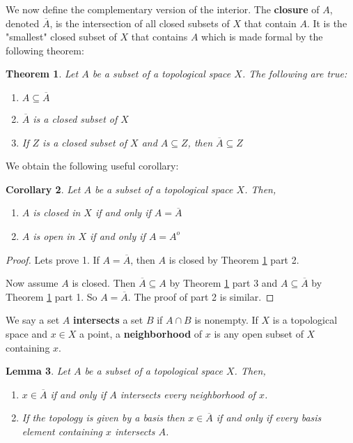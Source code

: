 \documentclass[a4paper]{article}
\newtheorem{theorem}{Theorem}
\newtheorem{lemma}[theorem]{Lemma}
\newtheorem{corollary}[theorem]{Corollary}
\numberwithin{theorem}{section}
\begin{document}
We now define the complementary version of the interior. The \textbf{closure} of $A$, denoted $\overline{A}$, is the intersection of all closed subsets of $X$ that contain $A$. It is the "smallest" closed subset of $X$ that contains $A$ which is made formal by the following theorem:

\begin{theorem} \label{closure}
Let $A$ be a subset of a topological space $X$. The following are true:
\begin{enumerate}
    \item $A \subseteq \overline{A}$
    \item $\overline{A}$ is a closed subset of $X$
    \item If $Z$ is a closed subset of $X$ and $A \subseteq Z$, then $\overline{A} \subseteq Z$
\end{enumerate}
\end{theorem}


We obtain the following useful corollary:
\begin{corollary}
Let $A$ be a subset of a topological space $X$. Then,
\begin{enumerate}
    \item $A$ is closed in $X$ if and only if $A = \overline{A}$
    \item $A$ is open in $X$ if and only if $A = A^o$
\end{enumerate}
\end{corollary}
\begin{proof}
Lets prove 1. If $A = \overline{A}$, then $A$ is closed by Theorem \ref{closure} part 2. 

Now assume $A$ is closed. Then $\overline{A} \subseteq A$ by Theorem \ref{closure} part 3 and $A \subseteq \overline{A}$ by Theorem \ref{closure} part 1. So $A = \overline{A}$. The proof of part 2 is similar.

\end{proof}

We say a set $A$ \textbf{intersects} a set $B$ if $A \cap B$ is nonempty. If $X$ is a topological space and $x \in X$ a point, a \textbf{neighborhood} of $x$ is any open subset of $X$ containing $x$.

\begin{lemma} \label{lem}
Let $A$ be a subset of a topological space $X$. Then,
\begin{enumerate}
    \item $x \in \overline{A}$ if and only if $A$ intersects every neighborhood of $x$.
    \item If the topology is given by a basis then $x \in \overline{A}$ if and only if every basis element containing $x$ intersects $A$.
\end{enumerate}
\end{lemma}
\end{document}
